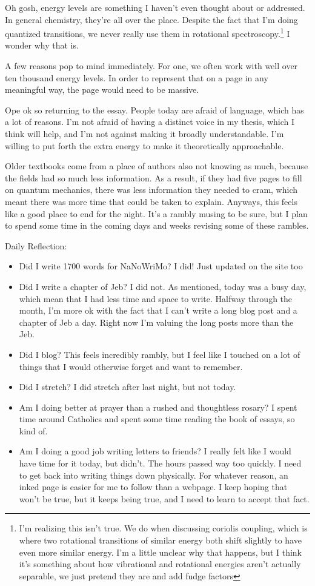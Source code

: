 \documentclass[12pt]{article}[titlepage]
\newcommand{\1}{\={a}}
\newcommand{\2}{\={e}}
\newcommand{\3}{\={\i}}
\newcommand{\4}{\=o}
\newcommand{\5}{\=u}
\newcommand{\6}{\={A}}
\renewcommand{\,}{\textsuperscript{,}}
\begin{document}
Oh gosh, energy levels are something I haven't even thought about or addressed.
In general chemistry, they're all over the place.
Despite the fact that I'm doing quantized transitions, we never really use them in rotational spectroscopy.\footnote{I'm realizing this isn't true.
We do when discussing coriolis coupling, which is where two rotational transitions of similar energy both shift slightly to have even more similar energy.
I'm a little unclear why that happens, but I think it's something about how vibrational and rotational energies aren't actually separable, we just pretend they are and add fudge factors}
I wonder why that is.

A few reasons pop to mind immediately.
For one, we often work with well over ten thousand energy levels.
In order to represent that on a page in any meaningful way, the page would need to be massive.

Ope ok so returning to the essay.
People today are afraid of language, which has a lot of reasons.
I'm not afraid of having a distinct voice in my thesis, which I think will help, and I'm not against making it broadly understandable.
I'm willing to put forth the extra energy to make it theoretically approachable.

Older textbooks come from a place of authors also not knowing as much, because the fields had so much less information.
As a result, if they had five pages to fill on quantum mechanics, there was less information they needed to cram, which meant there was more time that could be taken to explain.
Anyways, this feels like a good place to end for the night.
It's a rambly musing to be sure, but I plan to spend some time in the coming days and weeks revising some of these rambles.

Daily Reflection:
\begin{itemize}
\item Did I write 1700 words for NaNoWriMo?
I did! Just updated on the site too
\item Did I write a chapter of Jeb?
I did not. As mentioned, today was a busy day, which mean that I had less time and space to write.
Halfway through the month, I'm more ok with the fact that I can't write a long blog post and a chapter of Jeb a day.
Right now I'm valuing the long posts more than the Jeb.
\item Did I blog? This feels incredibly rambly, but I feel like I touched on a lot of things that I would otherwise forget and want to remember.
\item Did I stretch? I did stretch after last night, but not today.
\item Am I doing better at prayer than a rushed and thoughtless rosary? I spent time around Catholics and spent some time reading the book of essays, so kind of.
\item Am I doing a good job writing letters to friends? I really felt like I would have time for it today, but didn't.
The hours passed way too quickly.
I need to get back into writing things down physically.
For whatever reason, an inked page is easier for me to follow than a webpage.
I keep hoping that won't be true, but it keeps being true, and I need to learn to accept that fact.
\end{itemize}
\end{document}

